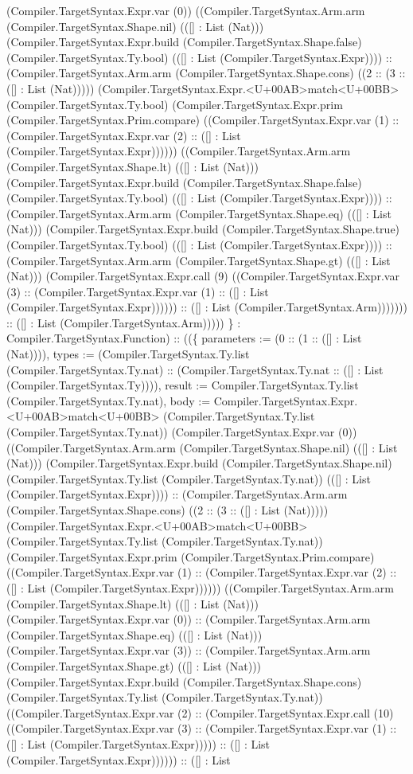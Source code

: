 \documentclass[11pt]{article}
\begin{document}
(Compiler.TargetSyntax.Expr.var (0)) ((Compiler.TargetSyntax.Arm.arm (Compiler.TargetSyntax.Shape.nil) (([] : List (Nat))) (Compiler.TargetSyntax.Expr.build (Compiler.TargetSyntax.Shape.false) (Compiler.TargetSyntax.Ty.bool) (([] : List (Compiler.TargetSyntax.Expr)))) :: (Compiler.TargetSyntax.Arm.arm (Compiler.TargetSyntax.Shape.cons) ((2 :: (3 :: ([] : List (Nat))))) (Compiler.TargetSyntax.Expr.<U+00AB>match<U+00BB> (Compiler.TargetSyntax.Ty.bool) (Compiler.TargetSyntax.Expr.prim (Compiler.TargetSyntax.Prim.compare) ((Compiler.TargetSyntax.Expr.var (1) :: (Compiler.TargetSyntax.Expr.var (2) :: ([] : List (Compiler.TargetSyntax.Expr)))))) ((Compiler.TargetSyntax.Arm.arm (Compiler.TargetSyntax.Shape.lt) (([] : List (Nat))) (Compiler.TargetSyntax.Expr.build (Compiler.TargetSyntax.Shape.false) (Compiler.TargetSyntax.Ty.bool) (([] : List (Compiler.TargetSyntax.Expr)))) :: (Compiler.TargetSyntax.Arm.arm (Compiler.TargetSyntax.Shape.eq) (([] : List (Nat))) (Compiler.TargetSyntax.Expr.build (Compiler.TargetSyntax.Shape.true) (Compiler.TargetSyntax.Ty.bool) (([] : List (Compiler.TargetSyntax.Expr)))) :: (Compiler.TargetSyntax.Arm.arm (Compiler.TargetSyntax.Shape.gt) (([] : List (Nat))) (Compiler.TargetSyntax.Expr.call (9) ((Compiler.TargetSyntax.Expr.var (3) :: (Compiler.TargetSyntax.Expr.var (1) :: ([] : List (Compiler.TargetSyntax.Expr)))))) :: ([] : List (Compiler.TargetSyntax.Arm))))))) :: ([] : List (Compiler.TargetSyntax.Arm))))) \} : Compiler.TargetSyntax.Function) :: ((\{ parameters := (0 :: (1 :: ([] : List (Nat)))), types := (Compiler.TargetSyntax.Ty.list (Compiler.TargetSyntax.Ty.nat) :: (Compiler.TargetSyntax.Ty.nat :: ([] : List (Compiler.TargetSyntax.Ty)))), result := Compiler.TargetSyntax.Ty.list (Compiler.TargetSyntax.Ty.nat), body := Compiler.TargetSyntax.Expr.<U+00AB>match<U+00BB> (Compiler.TargetSyntax.Ty.list (Compiler.TargetSyntax.Ty.nat)) (Compiler.TargetSyntax.Expr.var (0)) ((Compiler.TargetSyntax.Arm.arm (Compiler.TargetSyntax.Shape.nil) (([] : List (Nat))) (Compiler.TargetSyntax.Expr.build (Compiler.TargetSyntax.Shape.nil) (Compiler.TargetSyntax.Ty.list (Compiler.TargetSyntax.Ty.nat)) (([] : List (Compiler.TargetSyntax.Expr)))) :: (Compiler.TargetSyntax.Arm.arm (Compiler.TargetSyntax.Shape.cons) ((2 :: (3 :: ([] : List (Nat))))) (Compiler.TargetSyntax.Expr.<U+00AB>match<U+00BB> (Compiler.TargetSyntax.Ty.list (Compiler.TargetSyntax.Ty.nat)) (Compiler.TargetSyntax.Expr.prim (Compiler.TargetSyntax.Prim.compare) ((Compiler.TargetSyntax.Expr.var (1) :: (Compiler.TargetSyntax.Expr.var (2) :: ([] : List (Compiler.TargetSyntax.Expr)))))) ((Compiler.TargetSyntax.Arm.arm (Compiler.TargetSyntax.Shape.lt) (([] : List (Nat))) (Compiler.TargetSyntax.Expr.var (0)) :: (Compiler.TargetSyntax.Arm.arm (Compiler.TargetSyntax.Shape.eq) (([] : List (Nat))) (Compiler.TargetSyntax.Expr.var (3)) :: (Compiler.TargetSyntax.Arm.arm (Compiler.TargetSyntax.Shape.gt) (([] : List (Nat))) (Compiler.TargetSyntax.Expr.build (Compiler.TargetSyntax.Shape.cons) (Compiler.TargetSyntax.Ty.list (Compiler.TargetSyntax.Ty.nat)) ((Compiler.TargetSyntax.Expr.var (2) :: (Compiler.TargetSyntax.Expr.call (10) ((Compiler.TargetSyntax.Expr.var (3) :: (Compiler.TargetSyntax.Expr.var (1) :: ([] : List (Compiler.TargetSyntax.Expr))))) :: ([] : List (Compiler.TargetSyntax.Expr)))))) :: ([] : List 
\end{document}
